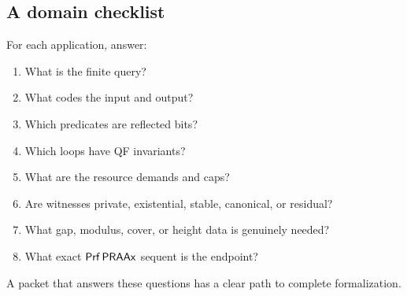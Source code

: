 \subsection{A domain checklist}

For each application, answer:

\begin{enumerate}
\item What is the finite query?
\item What codes the input and output?
\item Which predicates are reflected bits?
\item Which loops have QF invariants?
\item What are the resource demands and caps?
\item Are witnesses private, existential, stable, canonical, or residual?
\item What gap, modulus, cover, or height data is genuinely needed?
\item What exact \(\mathsf{Prf}\,\mathsf{PRAAx}\) sequent is the endpoint?
\end{enumerate}

A packet that answers these questions has a clear path to complete formalization.
